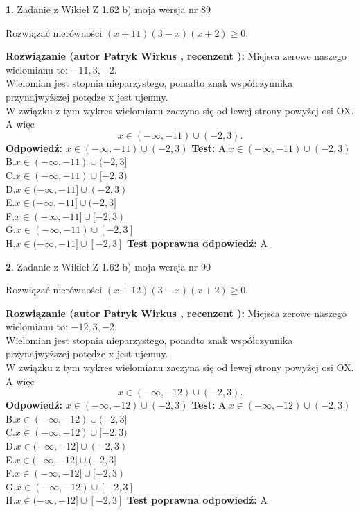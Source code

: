\documentclass[12pt, a4paper]{article}
\theoremstyle{definition} %
\newtheorem{zad}{}
\newcommand{\zadStart}[1]{\begin{zad}#1\newline}
\newcommand{\zadStop}{\end{zad}}
\newcommand{\rozwStart}[2]{\noindent \textbf{Rozwiązanie (autor #1 , recenzent #2): }\newline}
\newcommand{\rozwStop}{\newline}
\newcommand{\odpStart}{\noindent \textbf{Odpowiedź:}\newline}
\newcommand{\odpStop}{\newline}
\newcommand{\testStart}{\noindent \textbf{Test:}\newline}
\newcommand{\testStop}{\newline}
\newcommand{\kluczStart}{\noindent \textbf{Test poprawna odpowiedź:}\newline}
\newcommand{\kluczStop}{\newline}
\begin{document}
\zadStart{Zadanie z Wikieł Z 1.62 b) moja wersja nr 89}

Rozwiązać nierówności $(x+11)(3-x)(x+2)\ge0$.
\zadStop
\rozwStart{Patryk Wirkus}{}
Miejsca zerowe naszego wielomianu to: $-11, 3, -2$.\\
Wielomian jest stopnia nieparzystego, ponadto znak współczynnika przy\linebreak najwyższej potędze x jest ujemny.\\ W związku z tym wykres wielomianu zaczyna się od lewej strony powyżej osi OX. A więc $$x \in (-\infty,-11) \cup (-2,3).$$
\rozwStop
\odpStart
$x \in (-\infty,-11) \cup (-2,3)$
\odpStop
\testStart
A.$x \in (-\infty,-11) \cup (-2,3)$\\
B.$x \in (-\infty,-11) \cup (-2,3]$\\
C.$x \in (-\infty,-11) \cup [-2,3)$\\
D.$x \in (-\infty,-11] \cup (-2,3)$\\
E.$x \in (-\infty,-11] \cup (-2,3]$\\
F.$x \in (-\infty,-11] \cup [-2,3)$\\
G.$x \in (-\infty,-11) \cup [-2,3]$\\
H.$x \in (-\infty,-11] \cup [-2,3]$
\testStop
\kluczStart
A
\kluczStop



\zadStart{Zadanie z Wikieł Z 1.62 b) moja wersja nr 90}

Rozwiązać nierówności $(x+12)(3-x)(x+2)\ge0$.
\zadStop
\rozwStart{Patryk Wirkus}{}
Miejsca zerowe naszego wielomianu to: $-12, 3, -2$.\\
Wielomian jest stopnia nieparzystego, ponadto znak współczynnika przy\linebreak najwyższej potędze x jest ujemny.\\ W związku z tym wykres wielomianu zaczyna się od lewej strony powyżej osi OX. A więc $$x \in (-\infty,-12) \cup (-2,3).$$
\rozwStop
\odpStart
$x \in (-\infty,-12) \cup (-2,3)$
\odpStop
\testStart
A.$x \in (-\infty,-12) \cup (-2,3)$\\
B.$x \in (-\infty,-12) \cup (-2,3]$\\
C.$x \in (-\infty,-12) \cup [-2,3)$\\
D.$x \in (-\infty,-12] \cup (-2,3)$\\
E.$x \in (-\infty,-12] \cup (-2,3]$\\
F.$x \in (-\infty,-12] \cup [-2,3)$\\
G.$x \in (-\infty,-12) \cup [-2,3]$\\
H.$x \in (-\infty,-12] \cup [-2,3]$
\testStop
\kluczStart
A
\kluczStop
\end{document}

